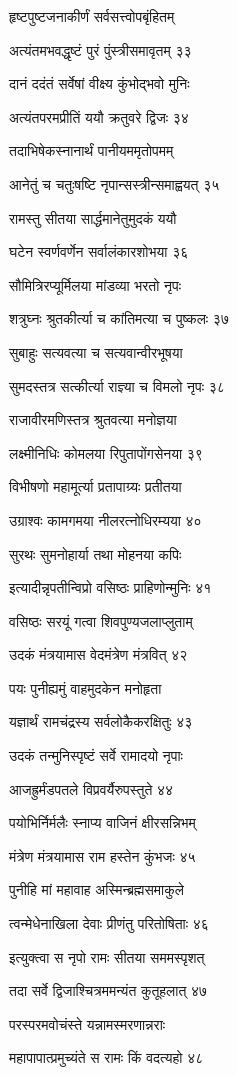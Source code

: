 हृष्टपुष्टजनाकीर्णं सर्वसत्त्वोपबृंहितम्

अत्यंतमभवद्धृष्टं पुरं पुंस्त्रीसमावृतम् ३३

दानं ददंतं सर्वेषां वीक्ष्य कुंभोद्भवो मुनिः

अत्यंतपरमप्रीतिं ययौ क्रतुवरे द्विजः ३४

तदाभिषेकस्नानार्थं पानीयममृतोपमम्

आनेतुं च चतुःषष्टि नृपान्सस्त्रीन्समाह्वयत् ३५

रामस्तु सीतया सार्द्धमानेतुमुदकं ययौ

घटेन स्वर्णवर्णेन सर्वालंकारशोभया ३६

सौमित्रिरप्यूर्मिलया मांडव्या भरतो नृपः

शत्रुघ्नः श्रुतकीर्त्या च कांतिमत्या च पुष्कलः ३७

सुबाहुः सत्यवत्या च सत्यवान्वीरभूषया

सुमदस्तत्र सत्कीर्त्या राज्ञ्या च विमलो नृपः ३८

राजावीरमणिस्तत्र श्रुतवत्या मनोज्ञया

लक्ष्मीनिधिः कोमलया रिपुतापोंगसेनया ३९

विभीषणो महामूर्त्या प्रतापाग्र्यः प्रतीतया

उग्राश्वः कामगमया नीलरत्नोधिरम्यया ४०

सुरथः सुमनोहार्या तथा मोहनया कपिः

इत्यादीन्नृपतीन्विप्रो वसिष्ठः प्राहिणोन्मुनिः ४१

वसिष्ठः सरयूं गत्वा शिवपुण्यजलाप्लुताम्

उदकं मंत्रयामास वेदमंत्रेण मंत्रवित् ४२

पयः पुनीह्यमुं वाहमुदकेन मनोहृता

यज्ञार्थं रामचंद्रस्य सर्वलोकैकरक्षितुः ४३

उदकं तन्मुनिस्पृष्टं सर्वे रामादयो नृपाः

आजह्रुर्मंडपतले विप्रवर्यैरुपस्तुते ४४

पयोभिर्निर्मलैः स्नाप्य वाजिनं क्षीरसन्निभम्

मंत्रेण मंत्रयामास राम हस्तेन कुंभजः ४५

पुनीहि मां महावाह अस्मिन्ब्रह्मसमाकुले

त्वन्मेधेनाखिला देवाः प्रीणंतु परितोषिताः ४६

इत्युक्त्वा स नृपो रामः सीतया सममस्पृशत्

तदा सर्वे द्विजाश्चित्रममन्यंत कुतूहलात् ४७

परस्परमवोचंस्ते यन्नामस्मरणान्नराः

महापापात्प्रमुच्यंते स रामः किं वदत्यहो ४८

